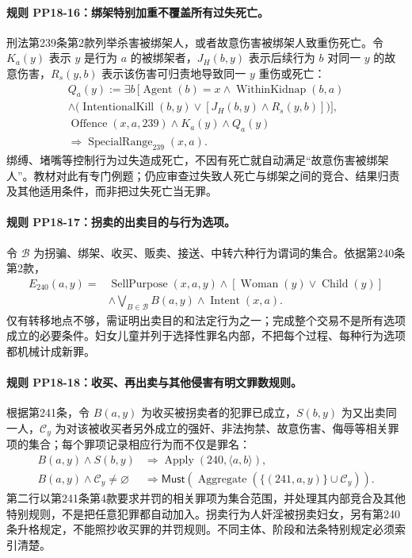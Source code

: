 \paragraph{规则 PP18-16：绑架特别加重不覆盖所有过失死亡。}
\mbox{}\par
刑法第239条第2款列举杀害被绑架人，或者故意伤害被绑架人致重伤死亡。令 $K_a(y)$ 表示 $y$ 是行为 $a$ 的被绑架者，$J_H(b,y)$ 表示后续行为 $b$ 对同一 $y$ 的故意伤害，$R_s(y,b)$ 表示该伤害可归责地导致同一 $y$ 重伤或死亡：
\[
\begin{gathered}
Q_a(y):=\exists b\,\bigl[\operatorname{Agent}(b)=x
\land\operatorname{WithinKidnap}(b,a)\\
\land\bigl(\operatorname{IntentionalKill}(b,y)
\lor[J_H(b,y)\land R_s(y,b)]\bigr)\bigr],\\
\operatorname{Offence}(x,a,239)\land K_a(y)\land Q_a(y)\\
\Rightarrow\operatorname{SpecialRange}_{239}(x,a).
\end{gathered}
\]
绑缚、堵嘴等控制行为过失造成死亡，不因有死亡就自动满足“故意伤害被绑架人”。教材对此有专门例题；仍应审查过失致人死亡与绑架之间的竞合、结果归责及其他适用条件，而非把过失死亡当无罪。

\paragraph{规则 PP18-17：拐卖的出卖目的与行为选项。}
\mbox{}\par
令 $\mathcal B$ 为拐骗、绑架、收买、贩卖、接送、中转六种行为谓词的集合。依据第240条第2款，
\[
\begin{aligned}
E_{240}(a,y)={}&\operatorname{SellPurpose}(x,a,y)
\land[\operatorname{Woman}(y)\lor\operatorname{Child}(y)]\\
&\land\bigvee_{B\in\mathcal B}B(a,y)
\land\operatorname{Intent}(x,a).
\end{aligned}
\]
仅有转移地点不够，需证明出卖目的和法定行为之一；完成整个交易不是所有选项成立的必要条件。妇女儿童并列于选择性罪名内部，不把每个过程、每种行为选项都机械计成新罪。

\paragraph{规则 PP18-18：收买、再出卖与其他侵害有明文罪数规则。}
\mbox{}\par
根据第241条，令 $B(a,y)$ 为收买被拐卖者的犯罪已成立，$S(b,y)$ 为又出卖同一人，$\mathcal C_y$ 为对该被收买者另外成立的强奸、非法拘禁、故意伤害、侮辱等相关罪项的集合；每个罪项记录相应行为而不仅是罪名：
\[
\begin{aligned}
B(a,y)\land S(b,y)&\Rightarrow\operatorname{Apply}(240,\langle a,b\rangle),\\
B(a,y)\land\mathcal C_y\ne\varnothing
&\Rightarrow\mathsf{Must}(\operatorname{Aggregate}(\{(241,a,y)\}\cup\mathcal C_y)).
\end{aligned}
\]
第二行以第241条第4款要求并罚的相关罪项为集合范围，并处理其内部竞合及其他特别规则，不是把任意犯罪都自动加入。拐卖行为人奸淫被拐卖妇女，另有第240条升格规定，不能照抄收买罪的并罚规则。不同主体、阶段和法条特别规定必须索引清楚。

